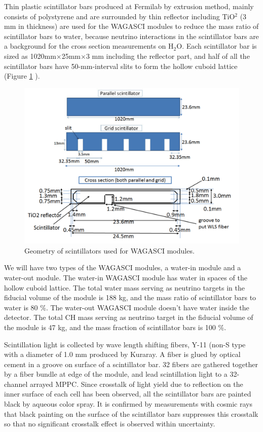 Thin plastic scintillator bars produced at Fermilab by extrusion method, mainly consists of polystyrene and are surrounded by thin reflector including TiO$^{2}$ (3 mm in thickness) are used for the WAGASCI modules to reduce the mass ratio of scintillator bars to water,
because neutrino interactions in the scintillator bars are a background for the cross section measurements on H$_{2}$O.
Each scintillator bar is sized as 1020mm$\times$25mm$\times$3 mm including the reflector part, and 
half of all the scintillator bars have 50-mm-interval slits to form the hollow cuboid lattice (Figure \ref{fig:wagasci_scinti_geometry} ). 

\begin{figure}[tbh]
\begin{center}
\includegraphics[width=0.8\linewidth]{fig/wagasci_scinti_geometry.pdf}
\end{center}
\caption{
Geometry of scintillators used for WAGASCI modules.
}
\label{fig:wagasci_scinti_geometry}
\end{figure}


We will have two types of the WAGASCI modules, a water-in module and a water-out module.
The water-in WAGASCI module has water in spaces of the hollow cuboid lattice.
The total water mass serving as neutrino targets in the fiducial volume of the module is 188 kg,
and the mass ratio of scintillator bars to water is 80 \%.
The water-out WAGASCI module doesn't have water inside the detector.
The total CH mass serving as neutrino target in the fiducial volume of the module is 47 kg,
and the mass fraction of scintillator bars is 100 \%.


Scintillation light is collected by wave length shifting fibers, Y-11 (non-S type  with a diameter of 1.0 mm produced by Kuraray. 
A fiber is glued by optical cement in a groove on surface of a scintillator bar. 
32 fibers are gathered together by a fiber bundle at edge of the module, and lead scintillation light to a 32-channel arrayed MPPC.
Since crosstalk of light yield due to reflection on the inner surface of each cell has been observed, all the scintillator bars are painted black by aqueous color spray.
It is confirmed by measurements with cosmic rays that black painting on the surface of the scintillator bars suppresses this crosstalk so that no significant crosstalk effect is observed within uncertainty.



